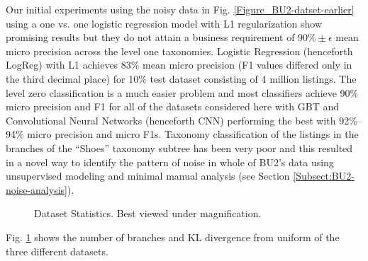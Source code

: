 Our initial experiments using the noisy data in Fig. \ref{Figure_BU2-datset-earlier} using a one vs. one logistic regression model with L1 regularization \cite{Yu13:EBay,LibShortText} show promising results but they do not attain a business requirement of $90\% \pm \epsilon$  mean micro precision across the level one taxonomies. 
Logistic Regression (henceforth LogReg) with L1 achieves 83\% mean micro precision (F1 values differed only in the third decimal place) for 10\% test dataset consisting of 4 million listings.
The level zero classification is a much easier problem and most classifiers achieve 90\% micro precision and F1 for all of the datasets considered here with GBT and Convolutional Neural Networks (henceforth CNN) \cite{Kim14} performing the best with 92\%--94\% micro precision and micro F1s. 
Taxonomy classification of the listings in the branches of the ``Shoes'' taxonomy subtree has been very poor and this resulted in a novel way to identify the pattern of noise in whole of BU2's data using unsupervised modeling and minimal manual analysis (see Section \ref{Subsect:BU2-noise-analysis}).

\begin{figure}[h]
\centering
	 \hspace{0.01cm}
	 \hspace{0.01cm}
	 \hspace{0.01cm}
	\caption{{{\small Dataset Statistics. Best viewed under magnification.}} }
	\label{Fig:Dataset-statistics}
\end{figure}

Fig. \ref{Fig:Dataset-statistics} shows the number of branches and KL divergence from uniform of the three different datasets.

